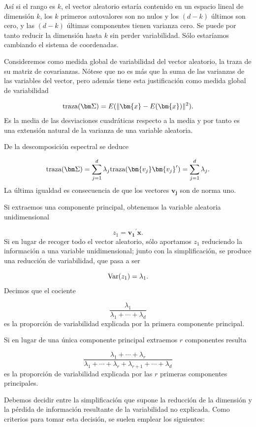 \documentclass[
  a4paper,
  oneside]{scrbook}
\theoremstyle{definition}
\theoremstyle{definition}
\theoremstyle{definition}
\theoremstyle{definition}
\theoremstyle{remark}
\begin{document}
Así si el rango es \(k\), el vector aleatorio estaría contenido en un
espacio lineal de dimensión \(k\), los \(k\) primeros autovalores son no
nulos y los \((d-k)\) últimos son cero, y las \((d-k)\) últimas componentes
tienen varianza cero. Se puede por tanto reducir la dimensión hasta \(k\)
sin perder variabilidad. Sólo estaríamos cambiando el sistema de
coordenadas.

Consideremos como medida global de variabilidad del vector aleatorio, la
traza de su matriz de covarianzas. Nótese que no es más que la suma de
las varianzas de las variables del vector, pero además tiene esta
justificación como medida global de variabilidad

\[\textnormal{traza}(\bm\Sigma)=E(\| \bm{x}-E(\bm{x})\|^2).\] Es la
media de las desviaciones cuadráticas respecto a la media y por tanto es
una extensión natural de la varianza de una variable aleatoria.

De la descomposición espectral se deduce

\[\textnormal{traza}(\bm\Sigma)=\sum_{j=1}^d \lambda_j \textnormal{traza}(\bm{v_j}\bm{v_j}^{\prime})=\sum_{j=1}^d \lambda_j.\]
La última igualdad es consecuencia de que los vectores \(\bm{v_j}\) son de
norma uno.

Si extraemos una componente principal, obtenemos la variable aleatoria
unidimensional

\[z_1=\bm{v_1}^{\prime} \bm{x}.\] Si en lugar de recoger
todo el vector aleatorio, sólo aportamos \(z_1\) reduciendo la información
a una variable unidimensional; junto con la simplificación, se produce
una reducción de variabilidad, que pasa a ser

\[\textnormal{Var}(z_1)=\lambda_1.\] Decimos que el cociente

\[\frac{\lambda_1}{\lambda_1+\cdots+\lambda_d}\] es la proporción de
variabilidad explicada por la primera componente principal.

Si en lugar de una única componente principal extraemos \(r\) componentes
resulta

\[\frac{\lambda_1+\cdots+\lambda_r}{\lambda_1+\cdots+\lambda_r+\lambda_{r+1}
+\cdots+\lambda_d}\] es la proporción de variabilidad explicada por las
\(r\) primeras componentes principales.

Debemos decidir entre la simplificación que supone la reducción de la
dimensión y la pérdida de información resultante de la variabilidad no
explicada. Como criterios para tomar esta decisión, se suelen emplear
los siguientes:
\end{document}
